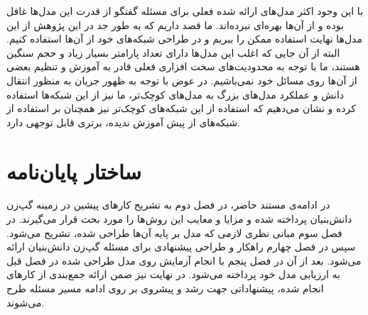 با این وجود اکثر مدل‌های ارائه شده فعلی برای مسئله گفتگو از قدرت این مدل‌ها غافل بوده و از آن‌ها بهره‌ای نبرده‌اند. ما قصد داریم که به طور جد در این پژوهش از این مدل‌ها نهایت استفاده ممکن را ببریم و در طراحی شبکه‌های خود از آن‌ها استفاده کنیم. البته از آن جایی که اغلب این مدل‌ها دارای تعداد پارامتر بسیار زیاد و حجم سنگین هستند، ما با توجه به محدودیت‌های سخت افزاری فعلی قادر به آموزش و تنظیم بعضی از آن‌ها روی مسائل خود نمی‌باشیم. در عوض با توجه به ظهور جریان 
به منظور انتقال دانش و عملکرد مدل‌های بزرگ به مدل‌‌های کوچک‌تر، ما نیز از این شبکه‌ها استفاده کرده و نشان می‌دهیم که استفاده از این شبکه‌های کوچک‌تر نیز همچنان بر استفاده از شبکه‌های از پیش آموزش ندیده، برتری قابل توجهی دارد.

\section{ساختار پایان‌نامه}

در ادامه‌ی مستند حاضر، در فصل دوم به تشریح کارهای پیشین در زمینه گپ‌زن دانش‌بنیان پرداخته شده و مزایا و معایب این روش‌ها را مورد بحث قرار می‌گیرند. در فصل سوم مبانی نظری لازمی که مدل بر پایه‌ آن‌ها طراحی شده، تشریح می‌شود. سپس در فصل چهارم راهکار و طراحی پیشنهادی برای مسئله گپ‌زن دانش‌بنیان ارائه می‌شود. بعد از آن در فصل پنجم با انجام آزمایش‌ روی مدل طراحی شده در فصل قبل به ارزیابی مدل خود پرداخته می‌شود. در نهایت نیز ضمن ارائه جمع‌بندی از کار‌های انجام شده، پیشنهاداتی جهت رشد و پیشروی بر روی ادامه مسیر مسئله طرح می‌شوند.
